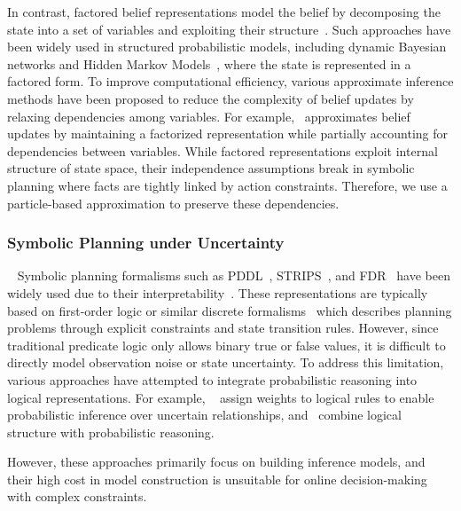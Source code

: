 In contrast, factored belief representations model the belief by decomposing the state into a set of variables and exploiting their structure~\cite{hansen2000dynamic, feng2001approximate, veiga2014point}. Such approaches have been widely used in structured probabilistic models, including dynamic Bayesian networks and Hidden Markov Models~\cite{eddy1996hidden}, where the state is represented in a factored form. To improve computational efficiency, various approximate inference methods have been proposed to reduce the complexity of belief updates by relaxing dependencies among variables. For example,~\cite{murphy2013factored} approximates belief updates by maintaining a factorized representation while partially accounting for dependencies between variables. While factored representations exploit internal structure of state space, their independence assumptions break in symbolic planning where facts are tightly linked by action constraints. Therefore, we use a particle-based approximation to preserve these dependencies.


\subsubsection{Symbolic Planning under Uncertainty}~\label{rel:pu_sym}
Symbolic planning formalisms such as PDDL~\cite{aeronautiques1998pddl}, STRIPS~\cite{fikes1971strips}, and FDR~\cite{helmert2009concise} have been widely used due to their interpretability~\cite{ghallab2016automated}. These representations are typically based on first-order logic or similar discrete formalisms~\cite{lifschitz2019answer} which describes planning problems through explicit constraints and state transition rules. However, since traditional predicate logic only allows binary true or false values, it is difficult to directly model observation noise or state uncertainty.
To address this limitation, various approaches have attempted to integrate probabilistic reasoning into logical representations. For example, ~\cite{richardson2006markov} assign weights to logical rules to enable probabilistic inference over uncertain relationships, and~\cite{qu2019probabilistic} combine logical structure with probabilistic reasoning.

However, these approaches primarily focus on building inference models, and their high cost in model construction is unsuitable for online decision-making with complex constraints. 

